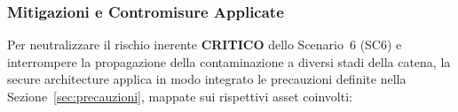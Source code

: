 \documentclass[11pt,a4paper]{article}
\begin{document}
%

\subsubsection{Mitigazioni e Contromisure Applicate}

Per neutralizzare il rischio inerente \textbf{CRITICO} dello Scenario~6 (SC6) e interrompere la
propagazione della contaminazione a diversi stadi della catena, la secure architecture applica
in modo integrato le precauzioni definite nella Sezione~\ref{sec:precauzioni}, mappate sui rispettivi
asset coinvolti:
\end{document}
